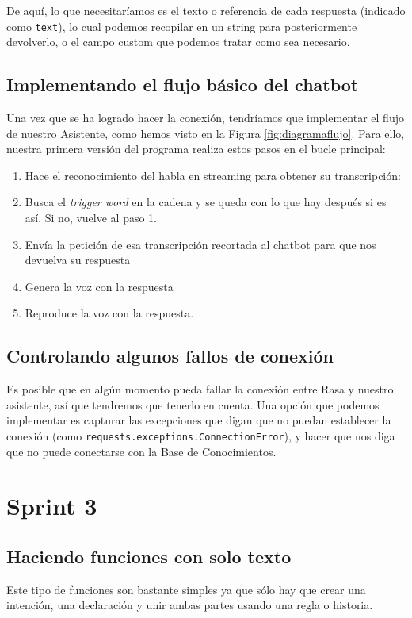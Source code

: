 De aquí, lo que necesitaríamos es el texto o referencia de cada respuesta (indicado como \texttt{text}), lo cual podemos recopilar en un string para posteriormente devolverlo, o el campo custom que podemos tratar como sea necesario.

\subsection{Implementando el flujo básico del chatbot}
Una vez que se ha logrado hacer la conexión, tendríamos que implementar el flujo de nuestro Asistente, como hemos visto en la Figura \ref{fig:diagramaflujo}. Para ello, nuestra primera versión del programa realiza estos pasos en el bucle principal:
\begin{enumerate}
	\item Hace el reconocimiento del habla en streaming para obtener su transcripción:
	\item Busca el \textit{trigger word} en la cadena y se queda con lo que hay después si es así. Si no, vuelve al paso 1.
	\item Envía la petición de esa transcripción recortada al chatbot para que nos devuelva su respuesta
	\item Genera la voz con la respuesta
	\item Reproduce la voz con la respuesta. 
\end{enumerate}



\subsection{Controlando algunos fallos de conexión}
Es posible que en algún momento pueda fallar la conexión entre Rasa y nuestro asistente, así que tendremos que tenerlo en cuenta. Una opción que podemos implementar es capturar las excepciones que digan que no puedan establecer la conexión (como \texttt{requests.exceptions.ConnectionError}), y hacer que nos diga que no puede conectarse con la Base de Conocimientos.

\section{Sprint 3}
\subsection{Haciendo funciones con solo texto}
Este tipo de funciones son bastante simples ya que sólo hay que crear una intención, una declaración y unir ambas partes usando una regla o historia.


